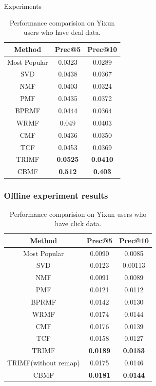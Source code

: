 \documentclass[xetex,mathserif,serif]{beamer}
\begin{document}
\begin{section}{Experiments}
\begin{frame}
\begin{table}
      \begin{center}
        \begin{tabular}{|c|c|c|}
          \hline
          Method&Prec@5&Prec@10\\
          \hline
          Most Popular&0.0323&0.0289\\
          \hline
          SVD&0.0438&0.0367\\
          \hline
          NMF&0.0403&0.0324\\
          \hline
          PMF&0.0435&0.0372\\
          \hline
          BPRMF&0.0444&0.0364\\
          \hline
          WRMF&0.049&0.0403\\
          \hline
          CMF&0.0436&0.0350\\
          \hline
          TCF&0.0453&0.0369\\
          \hline
          TRIMF&\textbf{\color{red}0.0525}&\textbf{\color{red}0.0410}\\
          \hline
          CBMF&\textbf{0.512}&\textbf{0.403}\\
          \hline
        \end{tabular}
      \end{center}
      \caption{Performance comparision on Yixun users who have deal data.}
      \label{shortdeal}

    \end{table}
  \end{frame}
  \begin{frame}
    \frametitle{Offline experiment results}
    \begin{table}

      \centering


      \begin{tabular}{|c|c|c|}
        \hline
        Method&Prec@5&Prec@10\\
        \hline
        Most Popular&0.0090&0.0085\\
        \hline
        SVD&0.0123&0.00113\\
        \hline
        NMF&0.0091&0.0089\\
        \hline
        PMF&0.0121&0.0112\\
        \hline
        BPRMF&0.0142&0.0130\\
        \hline
        WRMF&0.0174&0.0144\\
        \hline
        CMF&0.0176&0.0139\\
        \hline
        TCF&0.0158&0.0127\\
        \hline
        TRIMF&\textbf{\color{red}0.0189}&\textbf{\color{red}0.0153}\\
        \hline
        TRIMF(without remap)&0.0175&0.0146\\
        \hline
        CBMF&\textbf{0.0181}&\textbf{0.0144}\\
        \hline
      \end{tabular}
      \caption{Performance comparision on Yixun users who have click data.}
      

\end{table}
\end{frame}
\end{section}
\end{document}
